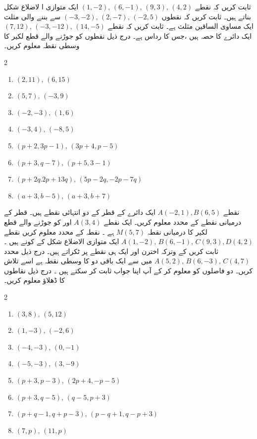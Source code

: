 ثابت کریں کہ نقطے \( (1,-2), \, (6,-1), \, (9,3), \, (4,2) \) ایک متوازی  ا  لاضلاع شکل بناتے ہیں۔
ثابت کریں کہ نقطوں \( (-3,-2), \, (2,-7), \, (-2,5) \) سے بننے والی مثلث ایک مساوی الساقین مثلث ہے۔
ثابت کریں کہ نقطے \( (7,12), \, (-3,-12), \, (14,-5)\)  ایک دائرے کا حصہ ہیں ،جس کا رداس   ہے۔
درج ذیل نقطوں کو جوڑنے والے قطع لکیر کا وسطی نقطہ معلوم کریں۔
\begin{multicols}{2}
\begin{enumerate}[.a]
\item \( (2,11), \, (6,15) \)
\item \( (5,7), \, (-3,9) \)
\item \( (-2,-3), \, (1,6) \)
\item \( (-3,4) , \, (-8,5) \)
\item \( (p+2, 3p-1), \, (3p+4,p-5) \)
\item \( (p+3,q-7), \, (p+5,3-1) \)
\item \( (p+2q.2p+13q), \, (5p-2q,-2p-7q) \)
\item \( (a+3,b-5), \, (a+3,b+7) \)
\end{enumerate}
\end{multicols}
نقطے \( A(-2,1) , B(6,5) \) ایک دائرے کے قطر کے دو انتہائی نقطے ہیں۔ قطر کے درمیانی نقطے کے محدد معلوم کریں۔ 
ایک نقطے \(A(3,4)\) اور  کو جوڑنے والے قطع لکیر کا درمیانی نقطہ  \(M(5,7)\)       ہے ۔ نقطہ      کے محدد معلوم کریں
نقطے \( A(1,-2), \, B(6,-1), \, C(9,3), D(4,2) \) ایک متوازی الاضلاع شکل کے کونے ہیں ۔ ثابت کریں کے وترکہ اخترن اور     ایک ہی نقطے پر ٹکراتے ہیں۔
درج ذیل محدد \( A(5,2), \, B(6,-3), \, C(4,7) \) میں سے ایک باقی دو کا وسطی نقطہ ہے اسے تلاش کریں۔ دو فاصلوں کو معلوم کر کے آپ اپنا جواب ثابت کر سکتے ہیں ۔
%
درج ذیل نقاطوں کا ڈھلاؤ معلوم کریں۔
\begin{multicols}{2}
\begin{enumerate}[.a]
\item \( (3,8), \, (5,12) \)
\item \( (1,-3), \, (-2,6) \)
\item \( (-4,-3), \, (0,-1) \)
\item \( (-5,-3), \, (3,-9) \)
\item \( (p+3, p-3), \, (2p+4,-p-5) \)
\item \( (p+3,q-5), \, (q-5, p+3) \)
\item \( (p+q-1, q+p-3), \, (p-q+1, q-p+3) \)
\item \( (7,p), \, ( 11,p) \)
\end{enumerate}
\end{multicols}

